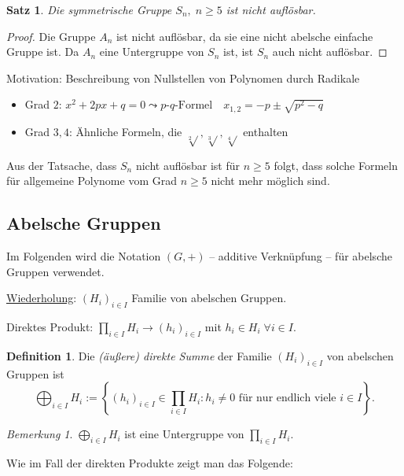 \documentclass[12pt]{scrartcl} %
\newtheorem{thm}{Satz}[section]
\theoremstyle{definition}
\newtheorem*{defn}{Definition}
\theoremstyle{remark}
\newtheorem*{nb}{Bemerkung}
\begin{document}
\begin{thm}
	Die symmetrische Gruppe $S_n,\;n\geq 5$ ist nicht auflösbar.
\end{thm}

\begin{proof}
	Die Gruppe $A_n$ ist nicht auflösbar, da sie eine nicht abelsche einfache Gruppe ist. Da $A_n$ eine Untergruppe von $S_n$ ist, ist $S_n$ auch nicht auflösbar.
\end{proof}


Motivation: Beschreibung von Nullstellen von Polynomen durch Radikale
\begin{itemize}
  \item Grad $2$: $x^2 + 2px + q = 0 \leadsto p\text{-}q\text{-Formel} \quad x_{1,2} = -p \pm \sqrt{p^{2} - q} $
  \item Grad $3,4$: Ähnliche Formeln, die $\sqrt[2]{}, \sqrt[3]{}, \sqrt[4]{}$ enthalten
\end{itemize}

Aus der Tatsache, dass $S_n$ nicht auflösbar ist für $n \geq 5$ folgt, dass solche Formeln für allgemeine Polynome vom Grad $n \geq 5$ nicht mehr möglich sind.

\subsection{Abelsche Gruppen}

Im Folgenden wird die Notation $(G,+)$ -- additive Verknüpfung -- für abelsche Gruppen verwendet.

\underline{Wiederholung}: $(H_i)_{i \in I}$ Familie von abelschen Gruppen.

Direktes Produkt: $\prod_{i \in I} H_i \to (h_i)_{i \in I}$ mit $h_i \in H_i \; \forall i \in I$.

\begin{defn}
  Die \emph{(äußere) direkte Summe} der Familie $(H_i)_{i \in I}$ von abelschen Gruppen ist 
  \[ \bigoplus_{i \in I} H_i := \left\{ (h_i)_{i \in I} \in \prod_{i \in I} H_i : h_i \neq 0 \text{ für nur endlich viele $i \in I$}\right\}. \]
\end{defn}

\begin{nb}
  $\bigoplus_{i \in I} H_i$ ist eine Untergruppe von $\prod_{i \in I} H_i$.
\end{nb}

Wie im Fall der direkten Produkte zeigt man das Folgende:
\end{document}
